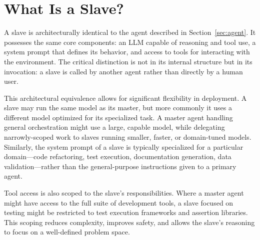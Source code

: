 \section{What Is a Slave?}\label{sec:subagent}

A slave is architecturally identical to the agent described in Section~\ref{sec:agent}. It possesses the same core components: an LLM capable of reasoning and tool use, a system prompt that defines its behavior, and access to tools for interacting with the environment. The critical distinction is not in its internal structure but in its invocation: a slave is called by another agent rather than directly by a human user.

This architectural equivalence allows for significant flexibility in deployment. A slave may run the same model as its master, but more commonly it uses a different model optimized for its specialized task. A master agent handling general orchestration might use a large, capable model, while delegating narrowly-scoped work to slaves running smaller, faster, or domain-tuned models. Similarly, the system prompt of a slave is typically specialized for a particular domain—code refactoring, test execution, documentation generation, data validation—rather than the general-purpose instructions given to a primary agent.

Tool access is also scoped to the slave's responsibilities. Where a master agent might have access to the full suite of development tools, a slave focused on testing might be restricted to test execution frameworks and assertion libraries. This scoping reduces complexity, improves safety, and allows the slave's reasoning to focus on a well-defined problem space.

